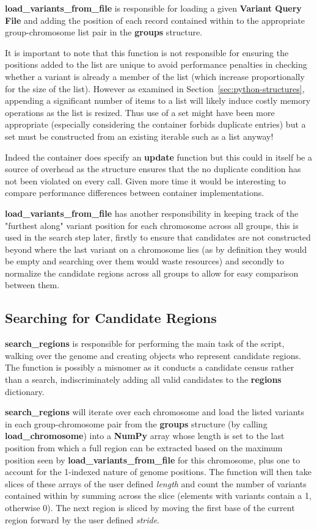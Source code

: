 \textbf{load\_variants\_from\_file} is responsible for loading a given
\textbf{Variant Query File} and adding the position of each record contained
within to the appropriate group-chromosome list pair in the \textbf{groups}
structure.

It is important to note that this function is not responsible for
ensuring the positions added to the list are unique to avoid performance
penalties in checking whether a variant is already a member of the list (which
increase proportionally for the size of the list).
However as examined in Section~\ref{sec:python-structures}, appending a
significant number of items to a list will likely induce costly memory
operations as the list is resized. Thus use of a set might have been more
appropriate (especially considering the container forbids duplicate entries)
but a set must be constructed from an existing iterable such as a list anyway!

Indeed the container does specify an \textbf{update} function but this could in
itself be a source of overhead as the structure ensures that the no duplicate
condition has not been violated on every call. Given more time it would be
interesting to compare performance differences between container implementations.

\textbf{load\_variants\_from\_file} has another responsibility in keeping track
of the "furthest along" variant position for each chromosome across all groups,
this is used in the search step later, firstly to ensure that candidates are not
constructed beyond where the last variant on a chromosome lies (as by definition
they would be empty and searching over them would waste resources) and secondly
to normalize the candidate regions across all groups to allow for easy
comparison between them.


\subsection{Searching for Candidate Regions}

\textbf{search\_regions} is responsible for performing the main task of the
script, walking over the genome and creating objects who represent candidate
regions. The function is possibly a misnomer as it conducts a candidate census
rather than a search, indiscriminately adding all valid candidates to the
\textbf{regions} dictionary.

\textbf{search\_regions} will iterate over each chromosome and load the listed
variants in each group-chromosome pair from the \textbf{groups} structure (by
calling \textbf{load\_chromosome}) into a
\textbf{NumPy} array whose length is set to the last position from which a full
region can be extracted based on the maximum position seen by
\textbf{load\_variants\_from\_file} for this chromosome, plus one to account for
the 1-indexed nature of genome positions. The function will then take slices of
these arrays of the user defined \textit{length} and count the number of
variants contained within by summing across the slice (elements with variants
contain a 1, otherwise 0). The next region is sliced by moving the first base of
the current region forward by the user defined \textit{stride}.

